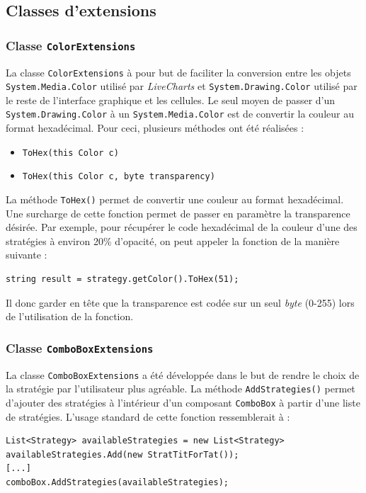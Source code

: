 \documentclass[a4paper]{article}
\begin{document}
\pagebreak
\subsection{Classes d'extensions}
\subsubsection{Classe \texttt{ColorExtensions}}
La classe \texttt{ColorExtensions} à pour but de faciliter la conversion entre les objets \texttt{System.Media.Color} utilisé par \textit{LiveCharts} et \texttt{System.Drawing.Color} utilisé par le reste de l'interface graphique et les cellules. Le seul moyen de passer d'un \texttt{System.Drawing.Color} à un \texttt{System.Media.Color} est de convertir la couleur au format hexadécimal. Pour ceci, plusieurs méthodes ont été réalisées : 

\begin{itemize}
    \item \texttt{ToHex(this Color c)}
    \item \texttt{ToHex(this Color c, byte transparency)}
\end{itemize}

La méthode \texttt{ToHex()} permet de convertir une couleur au format hexadécimal. Une surcharge de cette fonction permet de passer en paramètre la transparence désirée. Par exemple, pour récupérer le code hexadécimal de la couleur d'une des stratégies à environ 20\% d'opacité, on peut appeler la fonction de la manière suivante :

\begin{lstlisting}
string result = strategy.getColor().ToHex(51);
\end{lstlisting}

Il donc garder en tête que la transparence est codée sur un seul \textit{byte} (0-255) lors de l'utilisation de la fonction.

\subsubsection{Classe \texttt{ComboBoxExtensions}}
La classe \texttt{ComboBoxExtensions} a été développée dans le but de rendre le choix de la stratégie par l'utilisateur plus agréable. La méthode \texttt{AddStrategies()} permet d'ajouter des stratégies à l'intérieur d'un composant \texttt{ComboBox} à partir d'une liste de stratégies. L'usage standard de cette fonction ressemblerait à :
\begin{lstlisting}
List<Strategy> availableStrategies = new List<Strategy>
availableStrategies.Add(new StratTitForTat());
[...]
comboBox.AddStrategies(availableStrategies);
\end{lstlisting}
\end{document}
